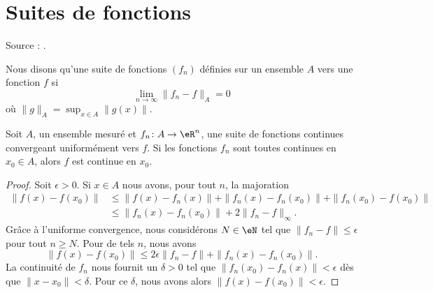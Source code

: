 \section{Suites de fonctions}
Source : \cite{TrenchRealAnalisys}.

\begin{definition}
    Nous disons qu'une suite de fonctions \( (f_n)\) définies sur un ensemble \( A\)  vers une fonction \( f\) si
    \begin{equation}
        \lim_{n\to \infty} \| f_n-f \|_A=0
    \end{equation}
    où \( \| g \|_A=\sup_{x\in A}\| g(x) \|\).
\end{definition}

\begin{theorem}			\label{ThoUnigCvCont}
    Soit \( A\), un ensemble mesuré et \( f_n\colon A\to \eR^n\), une suite de fonctions continues convergeant uniformément vers \( f\). Si les fonctions \( f_n\) sont toutes continues en \( x_0\in A\), alors \( f\) est continue en \( x_0\).
\end{theorem}

\begin{proof}
    Soit \( \epsilon>0\). Si \( x\in A\) nous avons, pour tout \( n\), la majoration
    \begin{subequations}
        \begin{align}
            \| f(x)-f(x_0) \|&\leq \| f(x)-f_n(x) \|+\| f_n(x)-f_n(x_0) \|+\| f_n(x_0)-f(x_0) \|\\
            &\leq\| f_n(x)-f_n(x_0) \|+2\| f_n-f \|_{\infty}.
        \end{align}
    \end{subequations}
    Grâce à l'uniforme convergence, nous considérons \(N\in \eN\) tel que \( \| f_n-f \|\leq \epsilon\) pour tout \( n\geq N\). Pour de tels \( n\), nous avons
    \begin{equation}
        \| f(x)-f(x_0) \|\leq 2\epsilon\| f_n-f \|+\| f_n(x)-f_n(x_0) \|.
    \end{equation}
    La continuité de \( f_n\) nous fournit un \( \delta>0\) tel que \( \| f_n(x_0)-f_n(x) \|<\epsilon\) dès que \( \| x-x_0 \|<\delta\). Pour ce \( \delta\), nous avons alors \( \| f(x)-f(x_0) \|<\epsilon\).
\end{proof}

